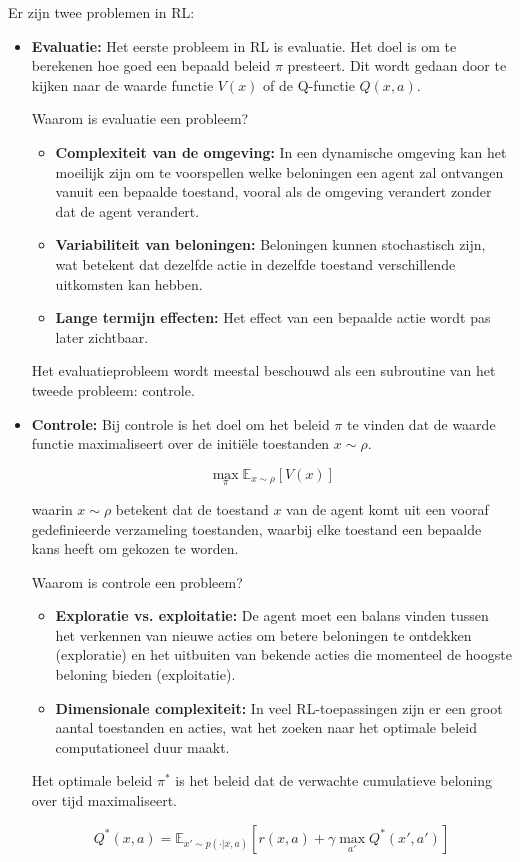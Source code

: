 \documentclass[a4paper,12pt]{report}
\begin{document}
Er zijn twee problemen in RL:
\begin{itemize}
    \item \textbf{Evaluatie:} Het eerste probleem in RL is evaluatie. Het doel is om te berekenen hoe goed een bepaald beleid \(\pi\) presteert. Dit wordt gedaan door te kijken naar de waarde functie \(V(x)\) of de Q-functie \(Q(x,a)\).

          Waarom is evaluatie een probleem?
          \begin{itemize}
              \item \textbf{Complexiteit van de omgeving:} In een dynamische omgeving kan het moeilijk zijn om te voorspellen welke beloningen een agent zal ontvangen vanuit een bepaalde toestand, vooral als de omgeving verandert zonder dat de agent verandert.
              \item \textbf{Variabiliteit van beloningen:} Beloningen kunnen stochastisch zijn, wat betekent dat dezelfde actie in dezelfde toestand verschillende uitkomsten kan hebben.
              \item \textbf{Lange termijn effecten:} Het effect van een bepaalde actie wordt pas later zichtbaar.
          \end{itemize}

          Het evaluatieprobleem wordt meestal beschouwd als een subroutine van het tweede
          probleem: controle.

    \item \textbf{Controle:} Bij controle is het doel om het beleid \(\pi\) te vinden dat de waarde functie maximaliseert over de initiële toestanden \(x \sim \rho\).

          \[
              \max_{\pi} \mathbb{E}_{x \sim \rho}[V(x)]
          \]

          \noindent waarin \(x \sim \rho\) betekent dat de toestand \(x\) van de agent komt uit een vooraf gedefinieerde verzameling toestanden, waarbij elke toestand een bepaalde kans heeft om gekozen te worden.

          Waarom is controle een probleem?
          \begin{itemize}
              \item \textbf{Exploratie vs. exploitatie:} De agent moet een balans vinden tussen het verkennen van nieuwe acties om betere beloningen te ontdekken (exploratie) en het uitbuiten van bekende acties die momenteel de hoogste beloning bieden (exploitatie).
              \item \textbf{Dimensionale complexiteit:} In veel RL-toepassingen zijn er een groot aantal toestanden en acties, wat het zoeken naar het optimale beleid computationeel duur maakt.
          \end{itemize}

          Het optimale beleid \(\pi^*\) is het beleid dat de verwachte cumulatieve
          beloning over tijd maximaliseert.

          \[
              Q^*(x,a) = \mathbb{E}_{x' \sim p(\cdot|x,a)}\left[r(x,a) + \gamma \max_{a'} Q^*(x',a')\right]
          \]
\end{itemize}
\end{document}
